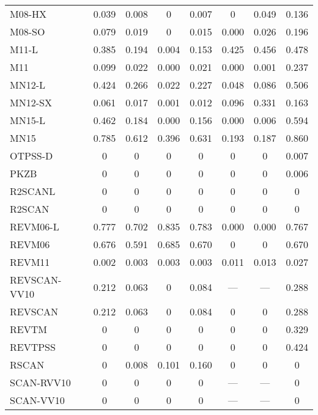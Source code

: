 \begin{table}
\begin{tabular}{|l|c|c|c|c|c|c|c|}
M08-HX~\cite{Zhao2008_1849} & 0.039 & 0.008 & 0 & 0.007 & 0 & 0.049 & 0.136 \\
M08-SO~\cite{Zhao2008_1849} & 0.079 & 0.019 & 0 & 0.015 & 0.000 & 0.026 & 0.196 \\
M11-L~\cite{Peverati2012_117} & 0.385 & 0.194 & 0.004 & 0.153 & 0.425 & 0.456 & 0.478 \\
M11~\cite{Peverati2011_2810} & 0.099 & 0.022 & 0.000 & 0.021 & 0.000 & 0.001 & 0.237 \\
MN12-L~\cite{Peverati2012_13171} & 0.424 & 0.266 & 0.022 & 0.227 & 0.048 & 0.086 & 0.506 \\
MN12-SX~\cite{Peverati2012_16187} & 0.061 & 0.017 & 0.001 & 0.012 & 0.096 & 0.331 & 0.163 \\
MN15-L~\cite{Yu2016_1280} & 0.462 & 0.184 & 0.000 & 0.156 & 0.000 & 0.006 & 0.594 \\
MN15~\cite{Yu2016_5032} & 0.785 & 0.612 & 0.396 & 0.631 & 0.193 & 0.187 & 0.860 \\
OTPSS-D~\cite{Goerigk2010_107} & 0 & 0 & 0 & 0 & 0 & 0 & 0.007 \\
PKZB~\cite{Perdew1999_2544} & 0 & 0 & 0 & 0 & 0 & 0 & 0.006 \\
R2SCANL~\cite{Mejia2020_121109,Furness2020_8208,Furness2020_9248} & 0 & 0 & 0 & 0 & 0 & 0 & 0 \\
R2SCAN~\cite{Furness2020_8208,Furness2020_9248} & 0 & 0 & 0 & 0 & 0 & 0 & 0 \\
REVM06-L~\cite{Wang2017_8487} & 0.777 & 0.702 & 0.835 & 0.783 & 0.000 & 0.000 & 0.767 \\
REVM06~\cite{Wang2018_10257} & 0.676 & 0.591 & 0.685 & 0.670 & 0 & 0 & 0.670 \\
REVM11~\cite{Verma2019_2966} & 0.002 & 0.003 & 0.003 & 0.003 & 0.011 & 0.013 & 0.027 \\
REVSCAN-VV10~\cite{Mezei2018_2469} & 0.212 & 0.063 & 0 & 0.084 & --- & --- & 0.288 \\
REVSCAN~\cite{Mezei2018_2469} & 0.212 & 0.063 & 0 & 0.084 & 0 & 0 & 0.288 \\
REVTM~\cite{Jana2019_6356} & 0 & 0 & 0 & 0 & 0 & 0 & 0.329 \\
REVTPSS~\cite{Perdew2009_026403,Perdew2009_026403_err} & 0 & 0 & 0 & 0 & 0 & 0 & 0.424 \\
RSCAN~\cite{Bartok2019_161101} & 0 & 0.008 & 0.101 & 0.160 & 0 & 0 & 0 \\
SCAN-RVV10~\cite{Peng2016_041005} & 0 & 0 & 0 & 0 & --- & --- & 0 \\
SCAN-VV10~\cite{Brandenburg2016_115144} & 0 & 0 & 0 & 0 & --- & --- & 0 \\

\end{tabular}
\end{table}
